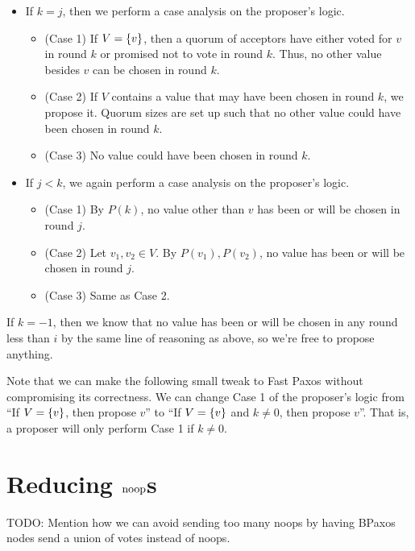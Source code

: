 \documentclass{mwhittaker}
\theoremstyle{definition}
\begin{document}
\begin{appendices}
\begin{itemize}
  \item
    If $k = j$, then we perform a case analysis on the proposer's logic.
    \begin{itemize}
      \item
        (Case 1) If $V = \{v\}$, then a quorum of acceptors have either voted
        for $v$ in round $k$ or promised not to vote in round $k$. Thus, no
        other value besides $v$ can be chosen in round $k$.
      \item
        (Case 2) If $V$ contains a value that may have been chosen in round
        $k$, we propose it. Quorum sizes are set up such that no other value
        could have been chosen in round $k$.
      \item
        (Case 3) No value could have been chosen in round $k$.
    \end{itemize}

  \item
    If $j < k$, we again perform a case analysis on the proposer's logic.
    \begin{itemize}
      \item
        (Case 1) By $P(k)$, no value other than $v$ has been or will be chosen
        in round $j$.
      \item
        (Case 2) Let $v_1, v_2 \in V$. By $P(v_1), P(v_2)$, no value has been
        or will be chosen in round $j$.
      \item
        (Case 3) Same as Case 2.
    \end{itemize}
\end{itemize}
If $k = -1$, then we know that no value has been or will be chosen in any round
less than $i$ by the same line of reasoning as above, so we're free to propose
anything.

Note that we can make the following small tweak to Fast Paxos without
compromising its correctness. We can change Case 1 of the proposer's logic from
``If $V = \{v\}$, then propose $v$'' to ``If $V = \{v\}$ and $k \neq 0$,
then propose $v$''. That is, a proposer will only perform Case 1 if $k \neq 0$.

\section{Reducing $\text{noop}$s}
TODO: Mention how we can avoid sending too many noops by having BPaxos nodes
send a union of votes instead of noops.

\end{appendices}
\end{document}
